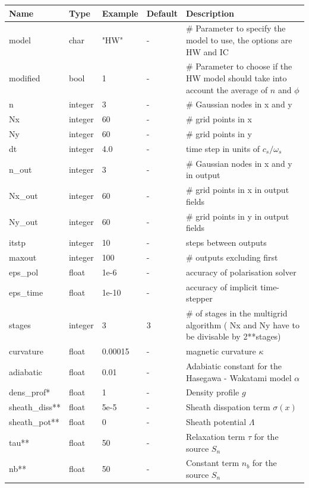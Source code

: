 \documentclass{hitec} %
\begin{document}
\begin{longtable}{llll>{\RaggedRight}p{7cm}}
\toprule
\rowcolor{gray!50}\textbf{Name} &  \textbf{Type} & \textbf{Example} & \textbf{Default} & \textbf{Description}  \\ \midrule
model  & char  & "HW" & - & \# Parameter to specify the model to use, the options are HW and IC \\
modified & bool & 1 & - & \# Parameter to choose if the HW model should take into account the average of $n$ and $\phi$ \\
n      & integer & 3 & - &\# Gaussian nodes in x and y \\
Nx     & integer & 60 & - &\# grid points in x \\
Ny     & integer & 60 & - &\# grid points in y \\
dt     & integer & 4.0 & - &time step in units of $c_s/\omega_s$ \\
n\_out  & integer & 3  & - &\# Gaussian nodes in x and y in output \\
Nx\_out & integer & 60 & - &\# grid points in x in output fields \\
Ny\_out & integer & 60 & - &\# grid points in y in output fields \\
itstp  & integer & 10  & - &   steps between outputs \\
maxout & integer & 100& - &      \# outputs excluding first \\
eps\_pol   & float & 1e-6    & - &  accuracy of polarisation solver \\
eps\_time  & float & 1e-10   & - & accuracy of implicit time-stepper \\
stages & integer & 3 & 3 & \# of stages in the  multigrid algorithm ( Nx and Ny have to be divisable by 2**stages) \\
curvature  & float & 0.00015 & - & magnetic curvature $\kappa$ \\
adiabatic  & float & 0.01 & - & Adabiatic constant for the Hasegawa - Wakatami model $\alpha$\\
dens\_prof*   & float & 1     & - & Density profile $g$ \\
sheath\_diss** & float & 5e-5  & - & Sheath disspation term $\sigma(x)$ \\
sheath\_pot**  & float & 0     & - & Sheath potential $\Lambda$ \\
tau**          & float & 50    & - & Relaxation term $\tau$ for the source $S_n$ \\
nb**          & float & 50    & - & Constant term $n_b$ for the source $S_n$ \\

\end{longtable}
\end{document}
